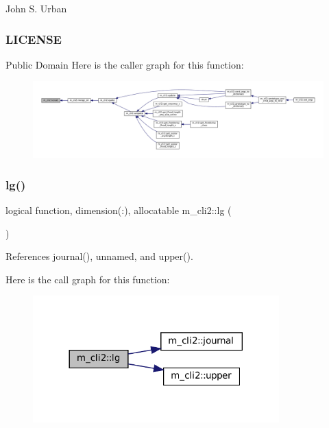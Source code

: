 John S. Urban \subsubsection*{L\+I\+C\+E\+N\+SE}

Public Domain Here is the caller graph for this function\+:
\nopagebreak
\begin{figure}[H]
\begin{center}
\leavevmode
\includegraphics[width=350pt]{namespacem__cli2_ad13853611abfee00d40ffa020662ec8a_icgraph}
\end{center}
\end{figure}
\mbox{\label{namespacem__cli2_aa1653cf1d6ce9739c1dcfdcb5361fa5f}} 
\subsubsection{\texorpdfstring{lg()}{lg()}}
{\footnotesize\ttfamily logical function, dimension(\+:), allocatable m\+\_\+cli2\+::lg (\begin{DoxyParamCaption}{ }\end{DoxyParamCaption})\hspace{0.3cm}{\ttfamily [private]}}



References journal(), unnamed, and upper().

Here is the call graph for this function\+:
\nopagebreak
\begin{figure}[H]
\begin{center}
\leavevmode
\includegraphics[width=269pt]{namespacem__cli2_aa1653cf1d6ce9739c1dcfdcb5361fa5f_cgraph}
\end{center}
\end{figure}
\mbox{\label{namespacem__cli2_a12c60a847f6ce11bd057e4fcc038a655}} 
